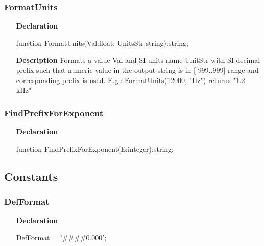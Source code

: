 \documentclass[12pt,a4paper,oneside]{report}
\newcommand{\declarationitem}[1]{\textbf{#1}}
\newcommand{\descriptiontitle}[1]{\textbf{#1}}
\begin{document}
\subsubsection{FormatUnits}
\label{lmunitsformat-FormatUnits}
\begin{itemize}\item[\declarationitem{Declaration}\hfill]
	\begin{flushleft}
		\begin{ttfamily}
			function FormatUnits(Val:float; UnitsStr:string):string;\end{ttfamily}
		
	\end{flushleft}
	
	\par
	\item[\descriptiontitle{Description}]
	Formats a value Val and SI units name UnitStr with SI decimal prefix such that numeric value in the output string is in [{-}999..999] range and corresponding prefix is used. E.g.: FormatUnits(12000, "Hz") returns "1.2 kHz"
	
\end{itemize}
\subsubsection{FindPrefixForExponent}
\label{lmunitsformat-FindPrefixForExponent}
\begin{itemize}\item[\declarationitem{Declaration}\hfill]
	\begin{flushleft}
		\begin{ttfamily}
			function FindPrefixForExponent(E:integer):string;\end{ttfamily}
		
	\end{flushleft}
	
\end{itemize}
\subsection{Constants}
\subsubsection{DefFormat}
\label{lmunitsformat-DefFormat}
\begin{itemize}\item[\declarationitem{Declaration}\hfill]
	\begin{flushleft}
		\begin{ttfamily}
			DefFormat = '{\#}{\#}{\#}{\#}0.000';\end{ttfamily}
		
	\end{flushleft}
	
\end{itemize}
\end{document}
